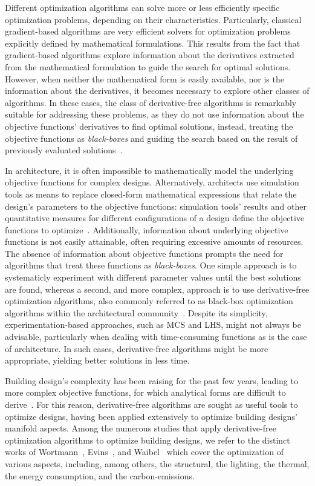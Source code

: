 	Different optimization algorithms can solve more or less efficiently specific optimization problems, depending on their characteristics. Particularly, classical gradient-based algorithms are very efficient solvers for optimization problems explicitly defined by mathematical formulations. This results from the fact that gradient-based algorithms explore information about the derivatives extracted from the mathematical formulation to guide the search for optimal solutions. However, when neither the mathematical form is easily available, nor is the information about the derivatives, it becomes necessary to explore other classes of algorithms. In these cases, the class of derivative-free algorithms is remarkably suitable for addressing these problems, as they do not use information about the objective functions' derivatives to find optimal solutions, instead, treating the objective functions as \textit{black-boxes} and guiding the search based on the result of previously evaluated solutions~\cite{Rios2013}.
	
	In architecture, it is often impossible to mathematically model the underlying objective functions for complex designs. Alternatively, architects use simulation tools as means to replace closed-form mathematical expressions that relate the design's parameters to the objective functions: simulation tools' results and other quantitative measures for different configurations of a design define the objective functions to optimize~\cite{Wortmann2016BBO}. Additionally, information about underlying objective functions is not easily attainable, often requiring excessive amounts of resources. The absence of information about objective functions prompts the need for algorithms that treat these functions as \textit{black-boxes}. One simple approach is to systematicly experiment with different parameter values until the best solutions are found, whereas a second, and more complex, approach is to use derivative-free optimization algorithms, also commonly referred to as black-box optimization algorithms within the architectural community~\cite{Wortmann2016BBO}. Despite its simplicity, experimentation-based approaches, such as \ac{MCS} and \ac{LHS}\cite{Giunta2003DOE}, might not always be advisable, particularly when dealing with time-consuming functions as is the case of architecture. In such cases, derivative-free algorithms might be more appropriate, yielding better solutions in less time.

	Building design's complexity has been raising for the past few years, leading to more complex objective functions, for which analytical forms are difficult to derive~\cite{Machairas2014}. For this reason, derivative-free algorithms are sought as useful tools to optimize designs, having been applied extensively to optimize building designs' manifold aspects. Among the numerous studies that apply derivative-free optimization algorithms to optimize building designs, we refer to the distinct works of Wortmann~\cite{Wortmann2016BBO,Wortmann2015AdvSBO,Wortmann2017GABESTCHOICE,Wortmann2017Opossum}, Evins~\cite{Evins2011,Evins2012MOO,Evins2013}, and Waibel~\cite{Waibel2018} which cover the optimization of various aspects, including, among others, the structural, the lighting, the thermal, the energy consumption, and the carbon-emissions. 
	
